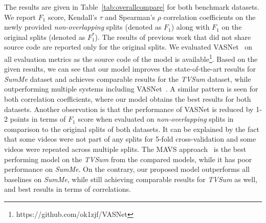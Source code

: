 \documentclass{article}
\begin{document}
The results are given in  Table~\ref{tab:overallcompare} for both benchmark datasets. We report $F_1$ score, Kendall’s $\tau$ and Spearman’s $\rho$ correlation coefficients on the newly provided \textit{non-overlapping} splits (denoted as $F_1$) along with $F_1$ on the original splits (denoted as $F_{1}^*$). The results of previous work that did not share source code are reported only for the original splits. We evaluated VASNet~\cite{DBLP:conf/accv/FajtlSAMR18} on all evaluation metrics as the source code of the model is available\footnote{https://github.com/ok1zjf/VASNet}. Based on the given results, we can see that our model improves the state-of-the-art results for \emph{SumMe} dataset and achieves comparable results for the \emph{TVSum} dataset, while outperforming multiple systems including VASNet~\cite{DBLP:conf/accv/FajtlSAMR18}. A similar pattern is seen for both correlation coefficients, where our model obtains the best results for both datasets. Another observation is that the performance of VASNet is reduced by 1-2 points in terms of $F_1$ score when evaluated on \textit{non-overlapping} splits in comparison to the original splits of both datasets. It can be explained by the fact that some videos were not part of any splits for 5-fold cross-validation and some videos were repeated across multiple splits. The MAVS approach~\cite{DBLP:conf/mm/FengLKZ18} is the best performing model on the \emph{TVSum} from the compared models, while it has poor performance on \emph{SumMe}. On the contrary, our proposed model outperforms all baselines on \emph{SumMe}, while still achieving comparable results for \emph{TVSum} as well, and best results in terms of correlations.
\end{document}
